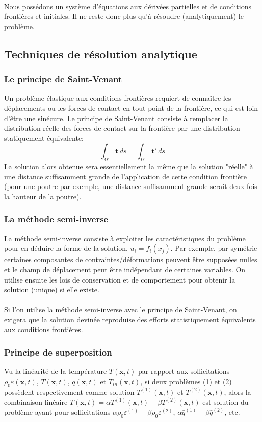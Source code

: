 \paragraph{}
Nous possédons un système d'équations aux dérivées partielles et de conditions frontières et initiales. Il ne reste donc plus qu'à résoudre (analytiquement) le problème.

\subsection{Techniques de résolution analytique}
\subsubsection*{Le principe de Saint-Venant}
Un problème élastique aux conditions frontières requiert de connaître les déplacements ou les forces de contact en tout point de la frontière, ce qui est loin d'être une sinécure. Le principe de Saint-Venant consiste à remplacer la distribution réelle des forces de contact sur la frontière par une distribution statiquement équivalente:
$$\int_{\Omega'}\textbf{t}\,ds=\int_{\Omega'}\textbf{t}'\,ds$$ La solution alors obtenue sera essentiellement la même que la solution "réelle" à une distance suffisamment grande de l'application de cette condition frontière (pour une poutre par exemple, une distance suffisamment grande serait deux fois la hauteur de la poutre).
\subsubsection*{La méthode semi-inverse}
La méthode semi-inverse consiste à exploiter les caractéristiques du problème pour en déduire la forme de la solution, $u_i=f_i(x_j)$. Par exemple, par symétrie certaines composantes de contraintes/déformations peuvent être supposées nulles et le champ de déplacement peut être indépendant de certaines variables. On utilise ensuite les lois de conservation et de comportement pour obtenir la solution (unique) si elle existe.
\paragraph{}
Si l'on utilise la méthode semi-inverse avec le principe de Saint-Venant, on exigera que la solution devinée reproduise des efforts statistiquement équivalents aux conditions frontières. 
\subsubsection*{Principe de superposition}
Vu la linéarité de la température $T(\textbf{x},t)$ par rapport aux sollicitations $\rho_0\varepsilon(\textbf{x},t)$, $\bar{T}(\textbf{x},t)$, $\bar{q}(\textbf{x},t)$ et $T_{in}(\textbf{x},t)$, si deux problèmes (1) et (2) possèdent respectivement comme solution $T^{(1)}(\textbf{x},t)$ et $T^{(2)}(\textbf{x},t)$, alors la combinaison linéaire $T(\textbf{x},t)=\alpha T^{(1)}(\textbf{x},t)+\beta T^{(2)}(\textbf{x},t)$ est solution du problème ayant pour sollicitations $\alpha\rho_0\varepsilon^{(1)}+\beta\rho_0\varepsilon^{(2)}$, $\alpha\bar{q}^{(1)}+\beta\bar{q}^{(2)}$, etc.
